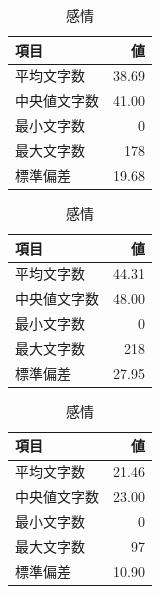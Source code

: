 \documentclass[a4j,12pt,dvipdfmx]{jsreport}
\begin{document}
\begin{table}[htbp]
   \centering
   \caption{Character Instance ノードに付与された自由記述属性の文字数統計}
   \label{tab:ci_text_stats}
   \begin{minipage}[t]{0.32\linewidth}
      \centering
      \caption*{姿勢}
      \begin{tabular}{lr}
         \toprule
         項目     & 値     \\
         \midrule
         平均文字数  & 38.69 \\
         中央値文字数 & 41.00 \\
         最小文字数  & 0     \\
         最大文字数  & 178   \\
         標準偏差   & 19.68 \\
         \bottomrule
      \end{tabular}
   \end{minipage}
   \hfill
   \begin{minipage}[t]{0.32\linewidth}
      \centering
      \caption*{行動}
      \begin{tabular}{lr}
         \toprule
         項目     & 値     \\
         \midrule
         平均文字数  & 44.31 \\
         中央値文字数 & 48.00 \\
         最小文字数  & 0     \\
         最大文字数  & 218   \\
         標準偏差   & 27.95 \\
         \bottomrule
      \end{tabular}
   \end{minipage}
   \hfill
   \begin{minipage}[t]{0.32\linewidth}
      \centering
      \caption*{感情}
      \begin{tabular}{lr}
         \toprule
         項目     & 値     \\
         \midrule
         平均文字数  & 21.46 \\
         中央値文字数 & 23.00 \\
         最小文字数  & 0     \\
         最大文字数  & 97    \\
         標準偏差   & 10.90 \\
         \bottomrule
      \end{tabular}
   \end{minipage}
\end{table}
\end{document}
